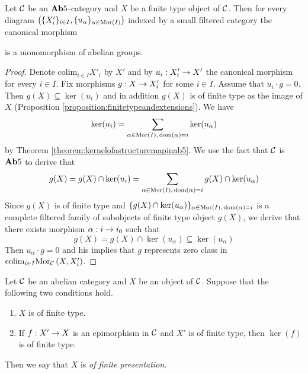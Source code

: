 \begin{proposition}\label{proposition:filteredcolimitsandfinitetype}
Let ${\mathcal C}$ be an $\mathbf{Ab}5$-category and $X$ be a finite type object of ${\mathcal C}$. Then for every diagram $\left(\{X'_i\}_{i\in I},\{u_{\alpha}\}_{\alpha \in \mathrm{Mor}(I)}\right)$ indexed by a small filtered category the canonical morphism
\begin{center}
\end{center}
is a monomorphism of abelian groups.
\end{proposition}
\begin{proof}
Denote $\mathrm{colim}_{i\in I}X'_i$ by $X'$ and by $u_i:X'_i\rightarrow X'$ the canonical morphism for every $i\in I$. Fix morphisms $g:X\rightarrow X'_{i}$ for some $i\in I$. Assume that $u_{i}\cdot g = 0$. Then $g(X)\subseteq \ker(u_{i})$ and in addition $g(X)$ is of finite type as the image of $X$ (Proposition \ref{proposition:finitetypeandextensions}). We have
$$\ker(u_{i}) = \sum_{\alpha \in \mathrm{Mor}(I),\,\mathrm{dom}(\alpha)=i}\ker(u_{\alpha})$$
by Theorem \ref{theorem:kernelofastructuremapinab5}. We use the fact that ${\mathcal C}$ is $\mathbf{Ab}5$ to derive that
$$g(X)= g(X)\cap \ker(u_{i}) = \sum_{\alpha \in \mathrm{Mor}(I),\,\mathrm{dom}(\alpha)=i}g(X)\cap \ker(u_{\alpha})$$
Since $g(X)$ is of finite type and $\{g(X)\cap \ker(u_{\alpha})\}_{\alpha \in \mathrm{Mor}(I),\,\mathrm{dom}(\alpha)=i}$ is a complete filtered family of subobjects of finite type object $g(X)$, we derive that there exists morphism $\alpha:i\rightarrow i_0$ such that 
$$g(X) = g(X)\cap \ker(u_{\alpha})\subseteq \ker(u_{\alpha})$$
Then $u_{\alpha}\cdot g = 0$ and his implies that $g$ represents zero class in $\mathrm{colim}_{i\in I}\mathrm{Mor}_{{\mathcal C}}\left(X,X'_i\right)$.
\end{proof}

\begin{definition}
Let ${\mathcal C}$ be an abelian category and $X$ be an object of ${\mathcal C}$. Suppose that the following two conditions hold.
\begin{enumerate}[label=\textbf{(\arabic*)}, leftmargin=3.0em]
\item $X$ is of finite type.
\item If $f:X'\rightarrow X$ is an epimorphism in ${\mathcal C}$ and $X'$ is of finite type, then $\ker(f)$ is of finite type.
\end{enumerate}
Then we say that $X$ is \textit{of finite presentation}.
\end{definition}

